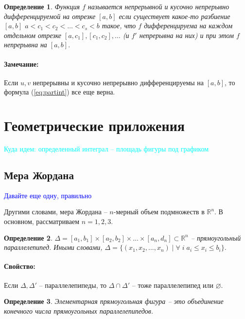 \documentclass{article}
\theoremstyle{plain}
\newtheorem{definition}{Определение}
\theoremstyle{definition}
\theoremstyle{remark}
\begin{document}
\begin{definition}
Функция $f$ называется непрерывной и кусочно непрерывно дифференцируемой на отрезке $[a,b]$ если существует какое-то разбиение $[a,b]$ $a<c_1 < c_2 < \ldots < c_{s} < b$
такое, что $f$ дифференцируема на каждом отдельном отрезке $[a, c_1], [c_1, c_2], \ldots $ (и $f'$ непрерывна на них) и при этом $f$ непрерывна на $[a, b].$
\end{definition}

\paragraph{Замечание:} Если $u, v$ непрерывны и кусочно непрерывно дифференцируемы на $[a, b]$, то формула (\ref{eq:partint}) все еще верна.

\section{Геометрические приложения}
\textcolor{cyan}{Куда идем: определенный интеграл -- площадь фигуры под графиком}

\subsection{Мера Жордана}
\textcolor{blue}{Давайте еще одну, правильно}


Другими словами, мера Жордана -- $n$-мерный объем подмножеств в $\mathbb{R}^n$. В основном, рассматриваем $n=1,2,3$.

\begin{definition}
$\Delta = [a_1, b_1] \times [a_2, b_2]\times \ldots \times[a_n, d_n] \subset \mathbb{R}^n$ -- прямоугольный параллелепипед.
Иными словами, $\Delta = \{(x_1, x_2, ... , x_n)\;|\; \forall\; i \; a_i \leq x_i \leq b_i\}.$
\end{definition}

\paragraph{Свойство:} Если $\Delta, \Delta'$ -- параллелепипеды, то $\Delta \cap \Delta'$ -- тоже параллелепипед или $\varnothing$.

\begin{definition}
Элементарная прямоугольная фигура -- это объединение конечного числа прямоугольных параллелепипедов. 
\end{definition}
\end{document}
